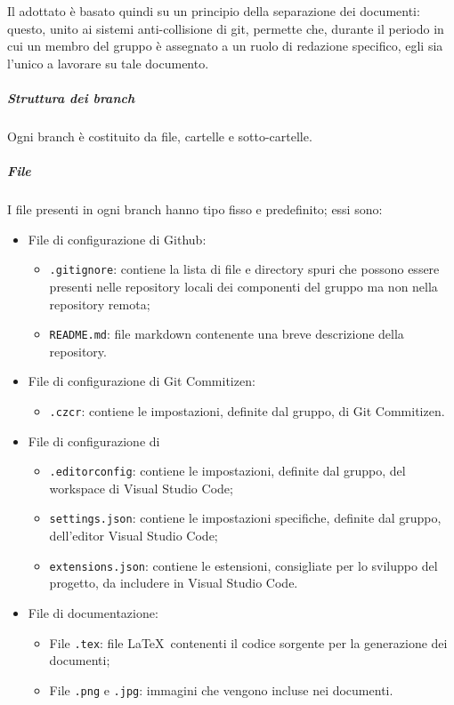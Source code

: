 \documentclass[../norme-di-progetto.tex]{subfiles}
\begin{document}
Il  adottato è basato quindi su un principio della separazione dei documenti: questo, unito ai sistemi anti-collisione di git, permette che, durante il periodo in cui un membro del gruppo è assegnato a un ruolo di redazione specifico, egli sia l'unico a lavorare su tale documento.
\subparagraph*{Struttura dei branch}
Ogni branch è costituito da file, cartelle e sotto-cartelle.
\subparagraph*{File}
I file presenti in ogni branch hanno tipo fisso e predefinito; essi sono:
\begin{itemize}
  \item File di configurazione di Github:
  \begin{itemize}
    \item \texttt{.gitignore}: contiene la lista di file e directory spuri che possono essere presenti nelle repository locali dei componenti del gruppo ma non nella repository remota;
    \item \texttt{README.md}: file markdown contenente una breve descrizione della repository.
  \end{itemize}
  \item File di configurazione di Git Commitizen:
  \begin{itemize}
    \item \texttt{.czcr}: contiene le impostazioni, definite dal gruppo, di Git Commitizen.
  \end{itemize}
  \item File di configurazione di 
  \begin{itemize}
    \item \texttt{.editorconfig}: contiene le impostazioni, definite dal gruppo, del workspace di Visual Studio Code;
    \item \texttt{settings.json}: contiene le impostazioni specifiche, definite dal gruppo, dell'editor Visual Studio Code;
    \item \texttt{extensions.json}: contiene le estensioni, consigliate per lo sviluppo del progetto, da includere in Visual Studio Code.
  \end{itemize}
  \item File di documentazione:
  \begin{itemize}
    \item File \texttt{.tex}: file \LaTeX\ contenenti il codice sorgente per la generazione dei documenti;
    \item File \texttt{.png} e \texttt{.jpg}: immagini che vengono incluse nei documenti.
  \end{itemize}
\end{itemize}
\end{document}
